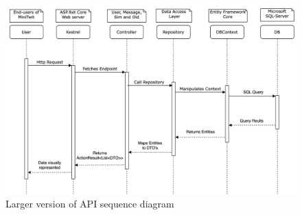 \begin{figure}[H]
    \centering
    \includegraphics[angle=90, width=15.0cm]
    {Images/SequenceDevOps.jpg} 
    \caption{Larger version of API sequence diagram}
    \label{fig: Vertical Data Journey}
\end{figure}
\newpage


